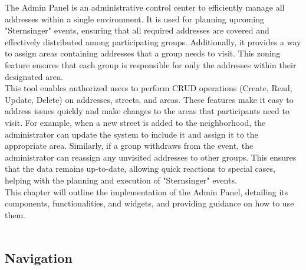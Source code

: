 \Author{\daAuthorOne}

The Admin Panel is an administrative control center to efficiently manage all addresses within a single environment. It is used for planning upcoming "Sternsinger" events, ensuring that all required addresses are covered and effectively distributed among participating groups. Additionally, it provides a way to assign areas containing addresses that a group needs to visit. This zoning feature ensures that each group is responsible for only the addresses within their designated area.\\

This tool enables authorized users to perform CRUD operations (Create, Read, Update, Delete) on addresses, streets, and areas. These features make it easy to address issues quickly and make changes to the areas that participants need to visit. For example, when a new street is added to the neighborhood, the administrator can update the system to include it and assign it to the appropriate area. Similarly, if a group withdraws from the event, the administrator can reassign any unvisited addresses to other groups. This ensures that the data remains up-to-date, allowing quick reactions to special cases, helping with the planning and execution of "Sternsinger" events.\\

This chapter will outline the implementation of the Admin Panel, detailing its components, functionalities, and widgets, and providing guidance on how to use them.\\\\


\subsection{Navigation}

